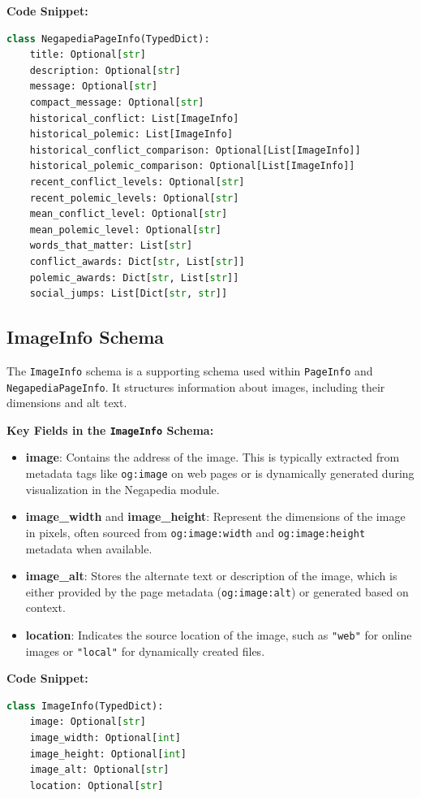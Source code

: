 \textbf{Code Snippet:}
\begin{lstlisting}[language=Python, caption={NegapediaPageInfo Schema}, label={lst:negapediapageinfo}]
class NegapediaPageInfo(TypedDict):
    title: Optional[str]
    description: Optional[str]
    message: Optional[str]
    compact_message: Optional[str]
    historical_conflict: List[ImageInfo]
    historical_polemic: List[ImageInfo]
    historical_conflict_comparison: Optional[List[ImageInfo]]
    historical_polemic_comparison: Optional[List[ImageInfo]]
    recent_conflict_levels: Optional[str]
    recent_polemic_levels: Optional[str]
    mean_conflict_level: Optional[str]
    mean_polemic_level: Optional[str]
    words_that_matter: List[str]
    conflict_awards: Dict[str, List[str]]
    polemic_awards: Dict[str, List[str]]
    social_jumps: List[Dict[str, str]]
\end{lstlisting}

\subsection{ImageInfo Schema}
\label{subsec:imageinfo_schema}
The \texttt{ImageInfo} schema is a supporting schema used within \texttt{PageInfo} and \texttt{NegapediaPageInfo}. It structures information about images, including their dimensions and alt text.

\textbf{Key Fields in the \texttt{ImageInfo} Schema:}
\begin{itemize}
    \item \textbf{image}: Contains the address of the image. This is typically extracted from metadata tags like \texttt{og:image} on web pages or is dynamically generated during visualization in the Negapedia module.
    \item \textbf{image\_width} and \textbf{image\_height}: Represent the dimensions of the image in pixels, often sourced from \texttt{og:image:width} and \texttt{og:image:height} metadata when available.
    \item \textbf{image\_alt}: Stores the alternate text or description of the image, which is either provided by the page metadata (\texttt{og:image:alt}) or generated based on context.
    \item \textbf{location}: Indicates the source location of the image, such as \texttt{"web"} for online images or \texttt{"local"} for dynamically created files.
\end{itemize}

\textbf{Code Snippet:}
\begin{lstlisting}[language=Python, caption={ImageInfo Schema}, label={lst:imageinfo}]
class ImageInfo(TypedDict):
    image: Optional[str]
    image_width: Optional[int]
    image_height: Optional[int]
    image_alt: Optional[str]
    location: Optional[str]
\end{lstlisting}

